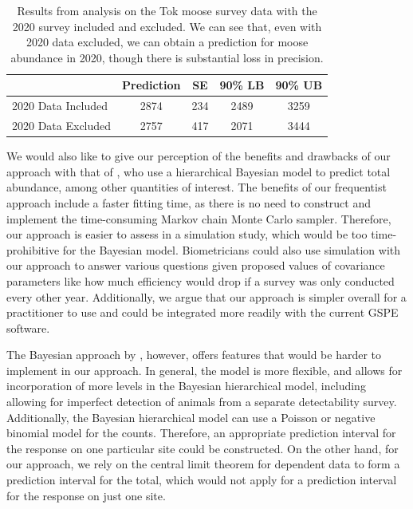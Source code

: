 \documentclass[]{interact}
\theoremstyle{plain}%
\theoremstyle{definition}
\theoremstyle{remark}
\begin{document}
\begin{table}[H]

\caption{\label{tab:forecast}Results from analysis on the Tok moose survey data with the 2020 survey included and excluded. We can see that, even with 2020 data excluded, we can obtain a prediction for moose abundance in 2020, though there is substantial loss in precision.}
\centering
\begin{tabular}[t]{lcccc}
\toprule
  & Prediction & SE & 90\% LB & 90\% UB\\
\midrule
2020 Data Included & 2874 & 234 & 2489 & 3259\\
2020 Data Excluded & 2757 & 417 & 2071 & 3444\\
\bottomrule
\end{tabular}
\end{table}

We would also like to give our perception of the benefits and drawbacks
of our approach with that of \citet{schmidt2022bayesian}, who use a
hierarchical Bayesian model to predict total abundance, among other
quantities of interest. The benefits of our frequentist approach include
a faster fitting time, as there is no need to construct and implement
the time-consuming Markov chain Monte Carlo sampler. Therefore, our
approach is easier to assess in a simulation study, which would be too
time-prohibitive for the Bayesian model. Biometricians could also use
simulation with our approach to answer various questions given proposed
values of covariance parameters like how much efficiency would drop if a
survey was only conducted every other year. Additionally, we argue that
our approach is simpler overall for a practitioner to use and could be
integrated more readily with the current GSPE software.

The Bayesian approach by \citet{schmidt2022bayesian}, however, offers
features that would be harder to implement in our approach. In general,
the model is more flexible, and allows for incorporation of more levels
in the Bayesian hierarchical model, including allowing for imperfect
detection of animals from a separate detectability survey. Additionally,
the Bayesian hierarchical model can use a Poisson or negative binomial
model for the counts. Therefore, an appropriate prediction interval for
the response on one particular site could be constructed. On the other
hand, for our approach, we rely on the central limit theorem for
dependent data to form a prediction interval for the total, which would
not apply for a prediction interval for the response on just one site.
\end{document}

